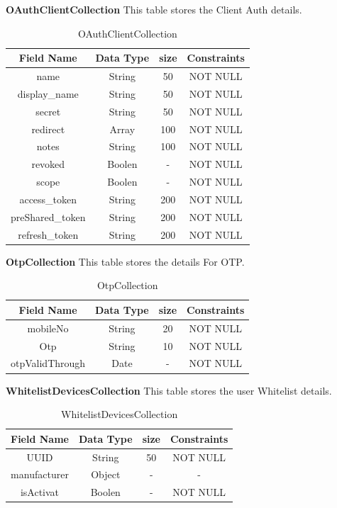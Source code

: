 \textbf{OAuthClientCollection} This table stores the Client Auth details.\nolinebreak
\begin{table}[hp]
\centering
\begin{tabular}{|c|c|c|c|}
\hline
\textbf{Field Name}  & \textbf{Data Type}  & \textbf{size} &\textbf{Constraints}  \\
\hline
name &	String	 & 50 & NOT NULL \\\hline
display\_name &	String	 & 50 & NOT NULL \\\hline
secret &	String	 & 50 & NOT NULL \\\hline
redirect &	Array	 & 100 & NOT NULL \\\hline
notes &	String	 & 100 & NOT NULL \\\hline
revoked &	Boolen	 & - & NOT NULL \\\hline
scope &	Boolen	 & - & NOT NULL \\\hline
access\_token &	String	 & 200 & NOT NULL \\\hline
preShared\_token &	String	 & 200 & NOT NULL \\\hline
refresh\_token &	String	 & 200 & NOT NULL \\\hline


\end{tabular}
\caption{OAuthClientCollection}
\end{table}

\pagebreak

\textbf{OtpCollection} This table stores the  details For OTP.\nolinebreak
\begin{table}[hp]
\centering
\begin{tabular}{|c|c|c|c|}
\hline
\textbf{Field Name}  & \textbf{Data Type}  & \textbf{size} &\textbf{Constraints}  \\
\hline
mobileNo & String &	20 & NOT NULL \\\hline
Otp & String &	10 & NOT NULL \\\hline
otpValidThrough & Date &	- & NOT NULL \\\hline

\end{tabular}
\caption{OtpCollection}
\end{table}

\textbf{WhitelistDevicesCollection} This table stores the user Whitelist details.\nolinebreak
\begin{table}[hp]
\centering
\begin{tabular}{|c|c|c|c|}
\hline
\textbf{Field Name}  & \textbf{Data Type}  & \textbf{size} &\textbf{Constraints}  \\
\hline
UUID & String &	50 & NOT NULL \\\hline
manufacturer & Object &	- & - \\\hline
isActivat & Boolen &	- & NOT NULL \\\hline

\end{tabular}
\caption{WhitelistDevicesCollection}
\end{table}



